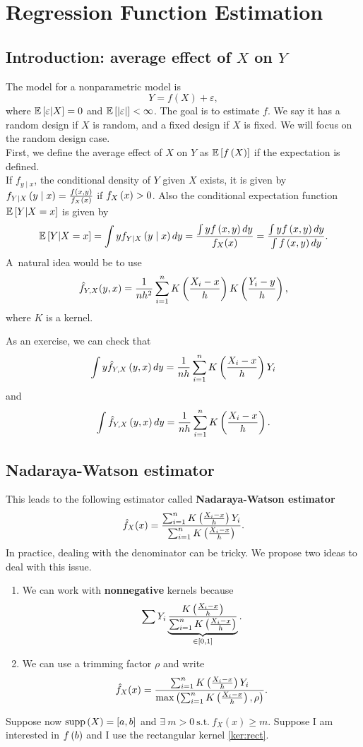 \section{Regression Function Estimation}
\subsection{Introduction: average effect of $X$ on $Y$}
The model for a nonparametric model is $$Y=f(X)+\varepsilon,$$ where
$\mathbb{E}\left[\varepsilon|X\right]=0$ and $\mathbb{E}\left[\left| \varepsilon\right|\right]<\infty$. The goal is
to estimate $f$. We say it has a random design if $X$ is random, and a fixed
design if $X$ is fixed. We will focus on the random design case. \\First, we
define the average effect of $X$ on $Y$ as $\mathbb{E}\left[f\left(X\right)\right]$ if the expectation
is defined. \\If $f_{y\mid x}$, the conditional density of $Y$ given $X$
exists, it is given by $f_{Y\mid X}\left(y\mid x\right) = \frac{f\left(x,y\right)}{f_X\left(x\right)}$
if $f_X\left(x\right)>0$. Also the conditional expectation function $\mathbb{E}\left[Y|X=x\right]$ is
given by $$\mathbb{E}\left[Y|X=x\right]= \int y f_{Y\mid X}\left(y\mid x\right)dy = \frac{\int y
        f\left(x,y\right)dy}{f_X(x)}=\frac{\int y f\left(x,y\right)dy}{\int f\left(x,y\right)dy}.$$ A\ natural
idea would be to use $$ \hat{f}_{Y,X}(y,x) = \frac{1}{nh^2}\sum_{i=1}^n
    K\left(\frac{X_i-x}{h}\right)K\left(\frac{Y_i-y}{h}\right),$$ where $K$ is a kernel.

As an exercise, we can check that $$\int y \hat{f}_{Y,X}\left(y,x\right)dy =
    \frac{1}{nh}\sum_{i=1}^n K\left(\frac{X_i-x}{h}\right)Y_i$$ and $$\int
    \hat{f}_{Y,X}\left(y,x\right)dy = \frac{1}{nh}\sum_{i=1}^n K\left(\frac{X_i-x}{h}\right).$$
\subsection{Nadaraya-Watson estimator}
This leads to the following estimator called \textbf{Nadaraya-Watson estimator}
$$\hat{f}_X(x) = \frac{\sum_{i=1}^n K\left(\frac{X_i-x}{h}\right)Y_i}{\sum_{i=1}^n
        K\left(\frac{X_i-x}{h}\right)}.$$ In practice, dealing with the denominator can be
tricky. We propose two ideas to deal with this issue.
\begin{enumerate}
    \item We can work with \textbf{nonnegative} kernels because \begin{equation*}
              \sum Y_i \underbrace{\frac{K\left(\frac{X_i-x}{h}\right)}{\sum_{i=1}^n K\left(\frac{X_i-x}{h}\right)}}_{\in \left[0,1\right]}.
          \end{equation*}
    \item We can use a trimming factor $\rho$ and write $$\hat{f}_X(x) =
              \frac{\sum_{i=1}^n K\left(\frac{X_i-x}{h}\right)Y_i}{\max\left(\sum_{i=1}^n
                      K\left(\frac{X_i-x}{h}\right),\rho\right)}.$$
\end{enumerate}
Suppose now $\text{supp}\left(X\right)=[a,b]$ and $\exists\ m>0\ \text{s.t.}\ f_X(x)\ge m$. Suppose I am interested in $f\left(b\right)$ and I use the rectangular kernel \ref{ker:rect}.

